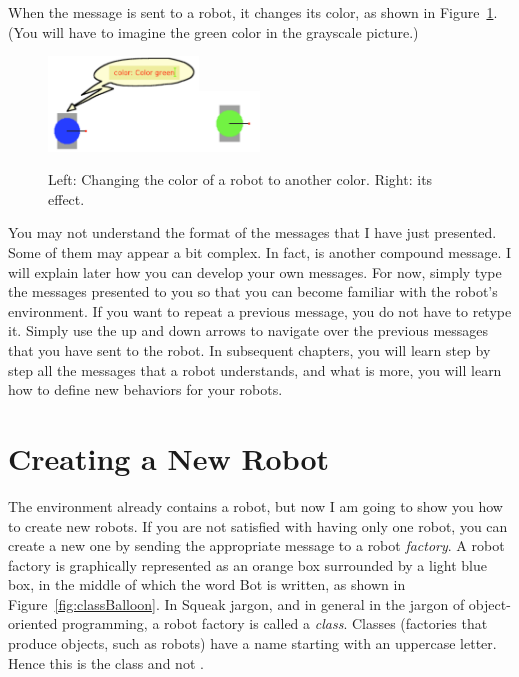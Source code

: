 \documentclass[a4paper,10pt,twoside]{book}
\begin{document}
When the message  is sent to a robot, it changes its color, as shown in 
Figure~\ref{fig:green}. (You will have to imagine the green color in the grayscale picture.) 


\begin{figure}[!h]\centerline{\hfill\includegraphics[width=4cm]{12-colorGreen2}\hfill\includegraphics[width=1.6cm]{13-green2}\hfill}
\caption{Left: Changing the color of a robot to another color. Right: its effect.\label{fig:green}}
\end{figure}


You may not understand the format of the messages that I have just presented. Some of 
them may appear a bit complex. In fact,  is another compound message. I 
will explain later how you can develop your own messages. For now, simply type the messages 
presented to you so that you can become familiar with the robot’s environment. If you want to 
repeat a previous message, you do not have to retype it. Simply use the up and down arrows to 
navigate over the previous messages that you have sent to the robot. In subsequent chapters, 
you will learn step by step all the messages that a robot understands, and what is more, you 
will learn how to define new behaviors for your robots. 




\section{Creating a New Robot}
The environment already contains a robot, but now I am going to show you how to create new 
robots. If you are not satisfied with having only one robot, you can create a new one by sending 
the appropriate message to a robot \emph{factory}. A robot factory is graphically represented as an 
orange box surrounded by a light blue box, in the middle of which the word Bot is written, 
as shown in Figure~\ref{fig:classBalloon}. In Squeak jargon, and in general in the jargon of object-oriented 
programming, a robot factory is called a \emph{class}. Classes (factories that produce objects, such as 
robots) have a name starting with an uppercase letter. Hence this is the class  and not . 
\end{document}
